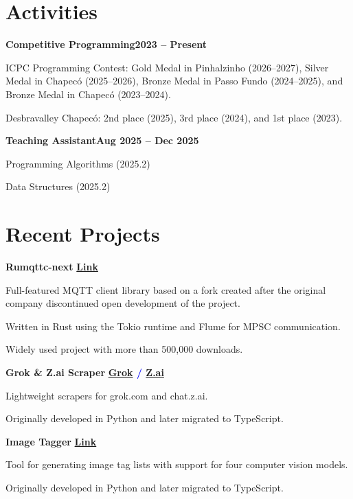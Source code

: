 \documentclass[a4paper,10pt]{article}
\newcommand{\heading}[2]{
\hspace{10pt}#1\hfill#2\\
}
\newcommand{\headingBf}[2]{
\heading{\textbf{#1}}{\textbf{#2}}
}
\newenvironment{resume_list}{
\vspace{-7pt}
\begin{itemize}[itemsep=-2px, parsep=1pt, leftmargin=30pt]
}{
\end{itemize}
}
\begin{document}

\section{Activities}

\headingBf{Competitive Programming}{2023 -- Present}
\begin{resume_list}
\item ICPC Programming Contest: Gold Medal in Pinhalzinho (2026--2027), Silver Medal in Chapecó (2025--2026), Bronze Medal in Passo Fundo (2024--2025), and Bronze Medal in Chapecó (2023--2024).
\item Desbravalley Chapecó: 2nd place (2025), 3rd place (2024), and 1st place (2023).
\end{resume_list}

\headingBf{Teaching Assistant}{Aug 2025 -- Dec 2025}
\begin{resume_list}
\item Programming Algorithms (2025.2)
\item Data Structures (2025.2)
\end{resume_list}


\section{Recent Projects}

\headingBf{Rumqttc-next}{
\textcolor{blue}{
\href{https://github.com/thehouseisonfire/rumqtt/}{Link}
}
}
\begin{resume_list}
\item Full-featured MQTT client library based on a fork created after the original company discontinued open development of the project.
\item Written in Rust using the Tokio runtime and Flume for MPSC communication.
\item Widely used project with more than 500,000 downloads.
\end{resume_list}

\headingBf{Grok \& Z.ai Scraper}{
\textcolor{blue}{
\href{https://github.com/thehouseisonfire/grok-scraper}{Grok} /
\href{https://github.com/thehouseisonfire/zai-scraper}{Z.ai}
}
}
\begin{resume_list}
\item Lightweight scrapers for grok.com and chat.z.ai.
\item Originally developed in Python and later migrated to TypeScript.
\end{resume_list}

\headingBf{Image Tagger}{
\textcolor{blue}{
\href{https://github.com/thehouseisonfire/image-tagger}{Link}
}
}
\begin{resume_list}
\item Tool for generating image tag lists with support for four computer vision models.
\item Originally developed in Python and later migrated to TypeScript.
\end{resume_list}
\end{document}

